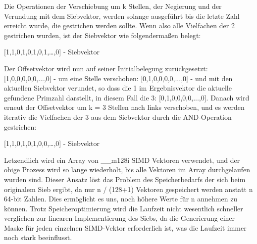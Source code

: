 \documentclass[course=erap]{aspdoc}
\begin{document}
Die Operationen der Verschiebung um k Stellen, der Negierung und der Verundung mit dem Siebvektor, werden solange ausgeführt bis die letzte Zahl erreicht wurde, die gestrichen werden sollte. Wenn also alle Vielfachen der 2 gestrichen wurden, ist der Siebvektor wie folgendermaßen belegt: 
\begin{center}[1,1,{\color{red}0},1,{\color{red}0},1,{\color{red}0},1,…,{\color{red}0}] -  Siebvektor\end{center}
Der Offsetvektor wird nun auf seiner Initialbelegung zurückgesetzt: [1,0,0,0,0,0,...,0] - um eine Stelle verschoben: [0,1,0,0,0,0,...,0] - und mit den aktuellen Siebvektor verundet, so dass die 1 im Ergebnisvektor die aktuelle gefundene Primzahl darstellt, in diesem Fall die 3: [0,1,0,0,0,0,...,0]. Danach wird erneut der Offsetvektor um k = 3 Stellen nach links verschoben, und es werden iterativ die Vielfachen der 3 aus dem Siebvektor durch die AND-Operation gestrichen: \begin{center}[1,1,0,1,0,1,0,{\color{red}0},…,0] -  Siebvektor\end{center}
Letzendlich wird ein Array von \_\_m128i SIMD Vektoren verwendet, und der obige Prozess wird so lange wiederholt, bis alle Vektoren im Array durchgelaufen wurden sind. 
Dieser Ansatz löst das Problem des Speicherbedarfs der sich beim originalem Sieb ergibt, da nur n / (128+1) Vektoren gespeichert werden anstatt n 64-bit Zahlen. Dies ermöglicht es uns, noch höhere Werte für n annehmen zu können. Trotz Speicheroptimierung wird die Laufzeit nicht wesentlich schneller verglichen zur linearen Implementierung des Siebs, da die Generierung einer Maske für jeden einzelnen SIMD-Vektor erforderlich ist, was die Laufzeit immer noch stark beeinflusst. 
\end{document}
